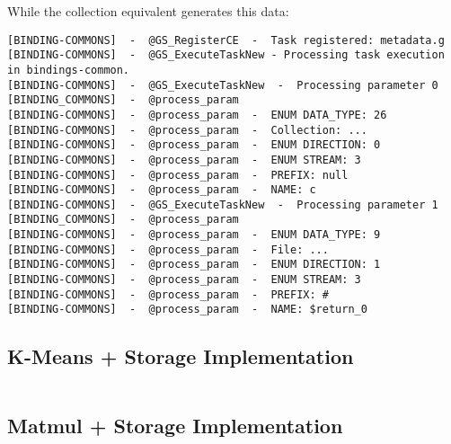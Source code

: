 While the collection equivalent generates this data:

\begin{verbatim}
[BINDING-COMMONS]  -  @GS_RegisterCE  -  Task registered: metadata.g
[BINDING-COMMONS]  -  @GS_ExecuteTaskNew - Processing task execution in bindings-common. 
[BINDING-COMMONS]  -  @GS_ExecuteTaskNew  -  Processing parameter 0
[BINDING_COMMONS]  -  @process_param
[BINDING-COMMONS]  -  @process_param  -  ENUM DATA_TYPE: 26
[BINDING-COMMONS]  -  @process_param  -  Collection: ...
[BINDING-COMMONS]  -  @process_param  -  ENUM DIRECTION: 0
[BINDING-COMMONS]  -  @process_param  -  ENUM STREAM: 3
[BINDING-COMMONS]  -  @process_param  -  PREFIX: null
[BINDING-COMMONS]  -  @process_param  -  NAME: c
[BINDING-COMMONS]  -  @GS_ExecuteTaskNew  -  Processing parameter 1
[BINDING_COMMONS]  -  @process_param
[BINDING-COMMONS]  -  @process_param  -  ENUM DATA_TYPE: 9
[BINDING-COMMONS]  -  @process_param  -  File: ...
[BINDING-COMMONS]  -  @process_param  -  ENUM DIRECTION: 1
[BINDING-COMMONS]  -  @process_param  -  ENUM STREAM: 3
[BINDING-COMMONS]  -  @process_param  -  PREFIX: #
[BINDING-COMMONS]  -  @process_param  -  NAME: $return_0
\end{verbatim}

\subsection{K-Means + Storage Implementation}
\label{subsec:kmeans_redis}
\inputminted{python}{snippets/kmeans_storage.py}


\subsection{Matmul + Storage Implementation}
\label{subsec:matmul_redis}
\inputminted{python}{snippets/matmul_storage.py}